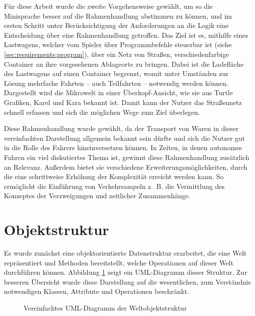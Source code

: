 Für diese Arbeit wurde die zweite Vorgehensweise gewählt, um so die Minisprache besser auf die Rahmenhandlung abstimmen zu können, und im ersten Schritt unter Berücksichtigung der Anforderungen an die Logik eine Entscheidung über eine Rahmenhandlung getroffen. Das Ziel ist es, mithilfe eines Lastwagens, welcher vom Spieler über Programmbefehle steuerbar ist (siehe \ref{sec:requirements:program}), über ein Netz von Straßen, verschiedenfarbige Container an ihre vorgesehenen Ablageorte zu bringen. Dabei ist die Ladefläche des Lastwagens auf einen Container begrenzt, womit unter Umständen zur Lösung mehrfache Fahrten -- auch Teilfahrten -- notwendig werden können. Dargestellt wird die Mikrowelt in einer Über\-kopf-An\-sicht, wie sie aus Turtle Grafiken, Karel und Kara bekannt ist. Damit kann der Nutzer das Straßennetz schnell erfassen und sich die möglichen Wege zum Ziel überlegen.

Diese Rahmenhandlung wurde gewählt, da der Transport von Waren in dieser vereinfachten Darstellung allgemein bekannt sein dürfte und sich die Nutzer gut in die Rolle des Fahrers hineinversetzen können. In Zeiten, in denen autonomes Fahren ein viel diskutiertes Thema ist, gewinnt diese Rahmenhandlung zusätzlich an Relevanz. Außerdem bietet sie verschiedene Erweiterungsmöglichkeiten, durch die eine schrittweise Erhöhung der Komplexität erreicht werden kann. So ermöglicht die Einführung von Verkehrsampeln z.~B. die Vermittlung des Konzeptes der Verzweigungen und zeitlicher Zusammenhänge.

\section{Objektstruktur}
\label{sec:implementation:structure}

Es wurde zunächst eine objektorientierte Datenstruktur erarbeitet, die eine Welt repräsentiert und Methoden bereitstellt, welche Operationen auf dieser Welt durchführen können. Abbildung \ref{fig:implementation:structure:uml} zeigt ein UML-Dia\-gramm dieser Struktur. Zur besseren Übersicht wurde diese Darstellung auf die wesentlichen, zum Verständnis notwendigen Klassen, Attribute und Operationen beschränkt.

\begin{figure}
  
  \caption{Vereinfachtes UML-Diagramm der Weltobjektstruktur}
  \label{fig:implementation:structure:uml}
\end{figure}

